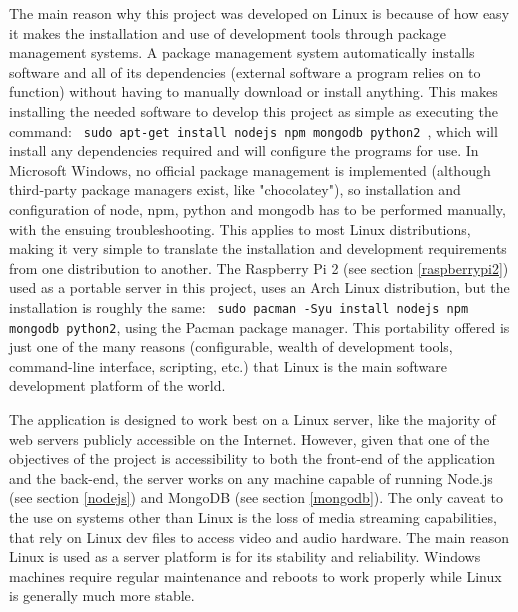 The main reason why this project was developed on Linux is because of how easy it makes the installation and use of development tools 
through package management systems. A package management system automatically installs software and all of its dependencies (external 
software a program relies on to function) without having to manually download or install anything. This makes installing the needed 
software to develop this project as simple as  executing the command: \texttt{ sudo apt-get install nodejs npm mongodb python2
}, which will install any dependencies required and will configure the programs for use. In Microsoft Windows, no official package 
management is implemented (although third-party package managers exist, like "chocolatey"), so installation and configuration of node, 
npm, python and mongodb has to be performed manually, with the ensuing troubleshooting. This applies to most Linux distributions, making 
it very simple to translate the installation and development requirements from one distribution to another. The Raspberry Pi 2 (see 
section \ref{raspberrypi2}) used as a portable server in this project, uses an Arch Linux distribution, but the installation is roughly 
the same: \texttt{ sudo pacman -Syu install nodejs npm mongodb python2}, using the Pacman package manager. This portability 
offered is just one of the many reasons (configurable, wealth of development tools, command-line interface, scripting, etc.) that Linux 
is the main software development platform of the world.

The application is designed to work best on a Linux server, like the majority of web servers publicly accessible on the Internet.
However, given that one of the objectives of the project is accessibility to both the front-end of the application and the back-end, the
server works on any machine capable of running Node.js (see section \ref{nodejs}) and MongoDB (see section \ref{mongodb}). The only
caveat to the use on systems other than Linux is the loss of media streaming capabilities, that rely on Linux dev files to access video
and audio hardware. The main reason Linux is used as a server platform is for its stability and reliability. Windows machines require
regular maintenance and reboots to work properly while Linux is generally much more stable.

